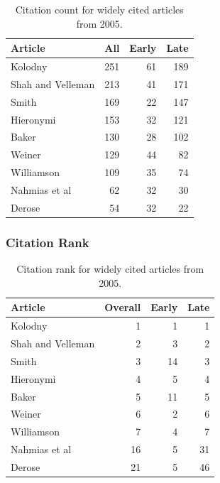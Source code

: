 \documentclass[
  10pt,
  letterpaper,
  DIV=11,
  numbers=noendperiod,
  twoside]{scrartcl}
\begin{document}
\begin{longtable}[]{@{}lrrr@{}}

\caption{\label{tbl-citation-count-2005}Citation count for widely cited
articles from 2005.}

\tabularnewline

\toprule\noalign{}
Article & All & Early & Late \\
\midrule\noalign{}
\endhead
\bottomrule\noalign{}
\endlastfoot
Kolodny & 251 & 61 & 189 \\
Shah and Velleman & 213 & 41 & 171 \\
Smith & 169 & 22 & 147 \\
Hieronymi & 153 & 32 & 121 \\
Baker & 130 & 28 & 102 \\
Weiner & 129 & 44 & 82 \\
Williamson & 109 & 35 & 74 \\
Nahmias et al & 62 & 32 & 30 \\
Derose & 54 & 32 & 22 \\

\end{longtable}

\subsubsection*{Citation Rank}\label{sec-rank-2005}

\begin{longtable}[]{@{}lrrr@{}}

\caption{\label{tbl-citation-rank-2005}Citation rank for widely cited
articles from 2005.}

\tabularnewline

\toprule\noalign{}
Article & Overall & Early & Late \\
\midrule\noalign{}
\endhead
\bottomrule\noalign{}
\endlastfoot
Kolodny & 1 & 1 & 1 \\
Shah and Velleman & 2 & 3 & 2 \\
Smith & 3 & 14 & 3 \\
Hieronymi & 4 & 5 & 4 \\
Baker & 5 & 11 & 5 \\
Weiner & 6 & 2 & 6 \\
Williamson & 7 & 4 & 7 \\
Nahmias et al & 16 & 5 & 31 \\
Derose & 21 & 5 & 46 \\

\end{longtable}
\end{document}
